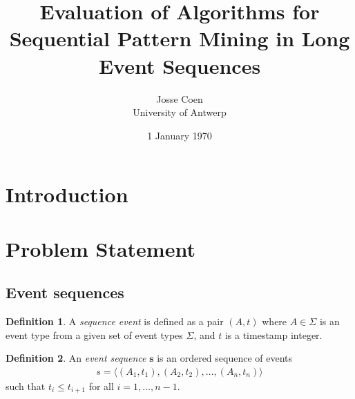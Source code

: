 \documentclass{scrartcl}
\theoremstyle{definition}
\newtheorem{definition}{Definition}
\begin{document}
\frenchspacing

\title{Evaluation of Algorithms for Sequential Pattern Mining in Long Event Sequences}
\subtitle{}

\author{Josse Coen
\vspace{.3cm}\\
%
University of Antwerp
%
}

\date{1 January 1970}

\maketitle

\section{Introduction}


\section{Problem Statement}

\subsection{Event sequences}

\begin{definition}
A \emph{sequence event} is defined as a pair $ (A, t) $ where $ A \in \Sigma $ is an event type from a given set of event types $ \Sigma $, and $ t $ is a timestamp integer.
\end{definition}

\begin{definition}
An \emph{event sequence} $ \boldsymbol{s} $ is an ordered sequence of events
\begin{align*}
s = \langle (A_1, t_1), (A_2, t_2), \ldots, (A_n, t_n) \rangle
\end{align*}
such that $ t_i \leq t_{i + 1} $ for all $ i = 1, \ldots, n - 1 $.
\end{definition}
\end{document}
